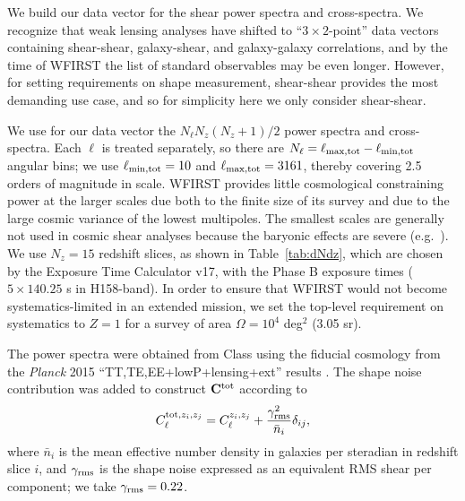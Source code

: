 \documentclass[usenatbib]{mnras}
\begin{document}
We build our data vector for the shear power spectra and cross-spectra. We recognize that weak lensing analyses have shifted to ``$3\times 2$-point'' data vectors containing shear-shear, galaxy-shear, and galaxy-galaxy correlations, and by the time of WFIRST the list of standard observables may be even longer. However, for setting requirements on shape measurement, shear-shear provides the most demanding use case, and so for simplicity here we only consider shear-shear.

We use for our data vector the $N_\ell N_z(N_z+1)/2$ power spectra and
cross-spectra. Each $\ell$ is treated separately, so there are
$N_\ell=\ell_{\rm max,tot}-\ell_{\rm min,tot}$ angular bins; we use
$\ell_{\rm min,tot}=10$ and $\ell_{\rm max,tot}=3161$, thereby
covering 2.5 orders of magnitude in scale. WFIRST provides little
cosmological constraining power at the larger scales due both to the
finite size of its survey and due to the large cosmic variance of the
lowest multipoles. The smallest scales are generally not used in
cosmic shear analyses because the baryonic effects are severe (e.g.\
\cite{2008PhRvD..77d3507Z, 2013PhRvD..87d3509Z}). We use $N_z=15$
redshift slices, as shown in Table~\ref{tab:dNdz}, which are chosen by the Exposure Time Calculator \citep{2012arXiv1204.5151H} v17, with the Phase B exposure times ($5\times 140.25$ s in H158-band). In order to ensure
that WFIRST would not become systematics-limited in an extended
mission, we set the top-level requirement on systematics to $Z=1$ for
a survey of area $\Omega =10^4$ deg$^2$ (3.05 sr).

The power spectra were obtained from {\sc Class}
\citep{2011JCAP...07..034B} using the fiducial cosmology from the
{\slshape Planck} 2015 ``TT,TE,EE+lowP+lensing+ext'' results
\citep{2016A&A...594A..13P}. The shape noise contribution was added to
construct ${\bf C}^{\rm tot}$ according to
\begin{equation}
C^{{\rm tot},z_i,z_j}_\ell = C^{z_i,z_j}_\ell + \frac{\gamma_{\rm rms}^2}{\bar n_i}\delta_{ij},
\end{equation}
where $\bar n_i$ is the mean effective number density in galaxies per
steradian in redshift slice $i$, and $\gamma_{\rm rms}$ is the shape
noise expressed as an equivalent RMS shear per component; we take
$\gamma_{\rm rms} = 0.22$.
\end{document}
